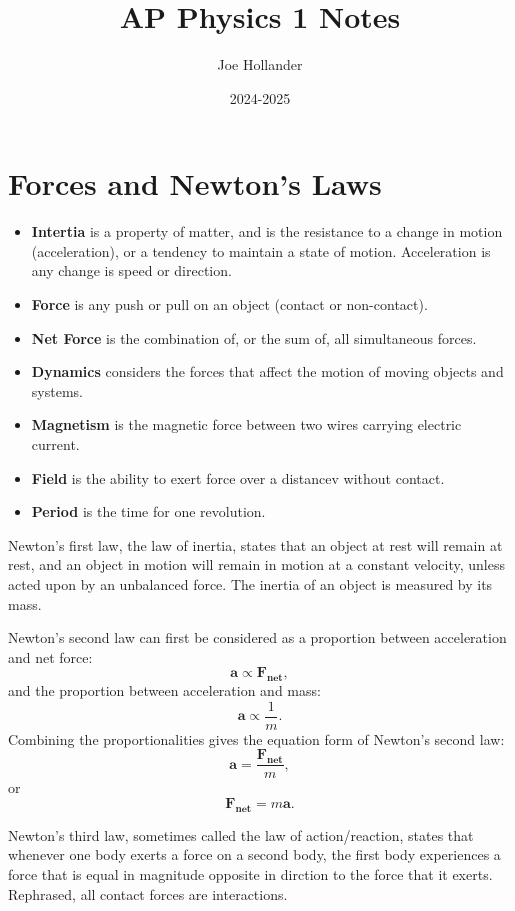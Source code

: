 \documentclass{article}
\title{AP Physics 1 Notes}
\author{Joe Hollander}
\date{2024-2025}
\begin{document}
\maketitle 

\section*{Forces and Newton's Laws}
\begin{itemize} 
    \item \textbf{Intertia} is a property of matter, 
and is the resistance to a change in motion (acceleration),
or a tendency to maintain a state of motion. 
Acceleration is any change is speed or direction.

    \item \textbf{Force} is any push or pull on an object (contact or non-contact).
    \item \textbf{Net Force} is the combination of, or the sum of, all simultaneous forces.
    \item \textbf{Dynamics} considers the forces that affect the motion of moving objects and systems. 
    \item \textbf{Magnetism} is the magnetic force between two wires carrying electric current. 
    \item \textbf{Field} is the ability to exert force over a distancev without contact.
    \item \textbf{Period} is the time for one revolution.  
\end{itemize}

Newton's first law, the law of inertia, states that an object at rest will remain at rest, 
and an object in motion will remain in motion at a constant velocity, unless acted upon by an unbalanced force.
The inertia of an object is measured by its mass. 

Newton's second law can first be considered as a proportion between acceleration and net force: 
\[
\mathbf{a \propto F_{net}}, 
\]
and the proportion between acceleration and mass:
\[
\mathbf{a} \propto \frac{1}{m}.
\]
Combining the proportionalities gives the equation form of Newton's second law:
\[
\mathbf{a} = \frac{\mathbf{F_{net}}}{m}, 
\]
or
\[
\mathbf{F_{net}} = m\mathbf{a}.
\]

Newton's third law, sometimes called the law of action/reaction, states that whenever one body exerts a force on a second body, 
the first body experiences a force that is equal in magnitude opposite in dirction to the force that it exerts.
Rephrased, all contact forces are interactions. 
\end{document}
